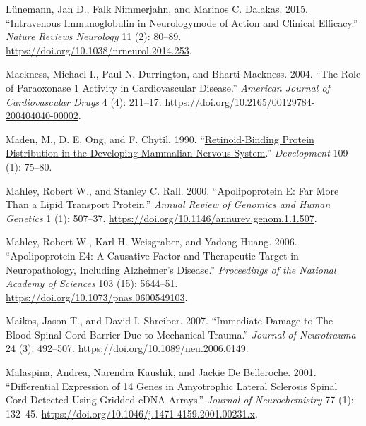 \documentclass[9pt,lineno]{elife}
\newlength{\cslhangindent}
\newlength{\cslentryspacingunit} %
\newenvironment{CSLReferences}[2] %
 {%
  \setlength{\parindent}{0pt}
  \ifodd #1
  \let\oldpar\par
  \def\par{\hangindent=\cslhangindent\oldpar}
  \fi
  \setlength{\parskip}{#2\cslentryspacingunit}
 }%
 {}
\begin{document}
\begin{CSLReferences}{1}{0}
\leavevmode{}%
Lünemann, Jan D., Falk Nimmerjahn, and Marinos C. Dalakas. 2015. {``Intravenous Immunoglobulin in Neurology\textemdash mode of Action and Clinical Efficacy.''} \emph{Nature Reviews Neurology} 11 (2): 80--89. \url{https://doi.org/10.1038/nrneurol.2014.253}.

\leavevmode{}%
Mackness, Michael I., Paul N. Durrington, and Bharti Mackness. 2004. {``The {Role} of {Paraoxonase} 1 {Activity} in {Cardiovascular Disease}.''} \emph{American Journal of Cardiovascular Drugs} 4 (4): 211--17. \url{https://doi.org/10.2165/00129784-200404040-00002}.

\leavevmode{}%
Maden, M., D. E. Ong, and F. Chytil. 1990. {``\href{https://www.ncbi.nlm.nih.gov/pubmed/2170099}{Retinoid-Binding Protein Distribution in the Developing Mammalian Nervous System}.''} \emph{Development} 109 (1): 75--80.

\leavevmode{}%
Mahley, Robert W., and Stanley C. Rall. 2000. {``Apolipoprotein {E}: {Far More Than} a {Lipid Transport Protein}.''} \emph{Annual Review of Genomics and Human Genetics} 1 (1): 507--37. \url{https://doi.org/10.1146/annurev.genom.1.1.507}.

\leavevmode{}%
Mahley, Robert W., Karl H. Weisgraber, and Yadong Huang. 2006. {``Apolipoprotein {E4}: {A} Causative Factor and Therapeutic Target in Neuropathology, Including {Alzheimer}'s Disease.''} \emph{Proceedings of the National Academy of Sciences} 103 (15): 5644--51. \url{https://doi.org/10.1073/pnas.0600549103}.

\leavevmode{}%
Maikos, Jason T., and David I. Shreiber. 2007. {``Immediate {Damage} to {The Blood-Spinal Cord Barrier Due} to {Mechanical Trauma}.''} \emph{Journal of Neurotrauma} 24 (3): 492--507. \url{https://doi.org/10.1089/neu.2006.0149}.

\leavevmode{}%
Malaspina, Andrea, Narendra Kaushik, and Jackie De Belleroche. 2001. {``Differential Expression of 14 Genes in Amyotrophic Lateral Sclerosis Spinal Cord Detected Using Gridded {cDNA} Arrays.''} \emph{Journal of Neurochemistry} 77 (1): 132--45. \url{https://doi.org/10.1046/j.1471-4159.2001.00231.x}.


\end{CSLReferences}
\end{document}
